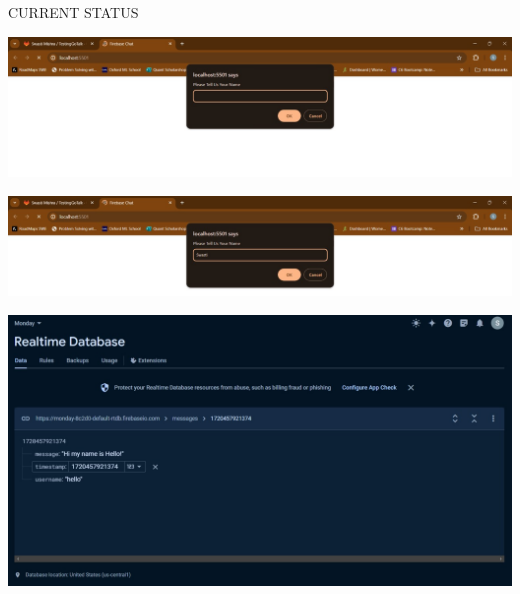 \documentclass{beamer}
\begin{document}
\begin{frame}{CURRENT STATUS}
    \begin{minipage}[t]{0.3\textwidth}
        \centering
        \includegraphics[width=\textwidth]{openpage.jpg}
    \end{minipage}
    \hfill
    \begin{minipage}[t]{0.3\textwidth}
        \centering
        \includegraphics[width=\textwidth]{entername}
    \end{minipage}
    \hfill
    \begin{minipage}[t]{0.3\textwidth}
        \centering
        \includegraphics[width=\textwidth]{database.jpg}
    \end{minipage}

    \vspace{0.5cm}


\end{frame}
\end{document}
